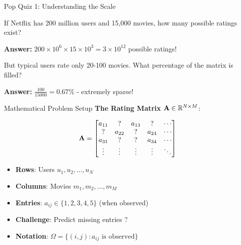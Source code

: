 \documentclass{beamer}
\begin{document}
\begin{frame}{Pop Quiz 1: Understanding the Scale}
\begin{tcolorbox}[colback=blue!5!white,colframe=blue!75!black,title=Quick Question]
If Netflix has 200 million users and 15,000 movies, how many possible ratings exist?

\pause
\vspace{0.5cm}
\textbf{Answer:} $200 \times 10^6 \times 15 \times 10^3 = 3 \times 10^{12}$ possible ratings!

\pause
But typical users rate only 20-100 movies. What percentage of the matrix is filled?

\pause
\textbf{Answer:} $\frac{100}{15000} = 0.67\%$ - extremely sparse!
\end{tcolorbox}
\end{frame}

\begin{frame}{Mathematical Problem Setup}
\textbf{The Rating Matrix} $\mathbf{A} \in \mathbb{R}^{N \times M}$:
\pause

\begin{equation*}
\mathbf{A} = \begin{bmatrix}
a_{11} & ? & a_{13} & ? & \cdots \\
? & a_{22} & ? & a_{24} & \cdots \\
a_{31} & ? & ? & a_{34} & \cdots \\
\vdots & \vdots & \vdots & \vdots & \ddots
\end{bmatrix}
\end{equation*}

\pause
\begin{itemize}[<+->]
    \item \textbf{Rows}: Users $u_1, u_2, \ldots, u_N$ 
    \item \textbf{Columns}: Movies $m_1, m_2, \ldots, m_M$
    \item \textbf{Entries}: $a_{ij} \in \{1,2,3,4,5\}$ (when observed)
    \item \textbf{Challenge}: Predict missing entries $?$
    \item \textbf{Notation}: $\Omega = \{(i,j) : a_{ij} \text{ is observed}\}$
\end{itemize}
\end{frame}
\end{document}
